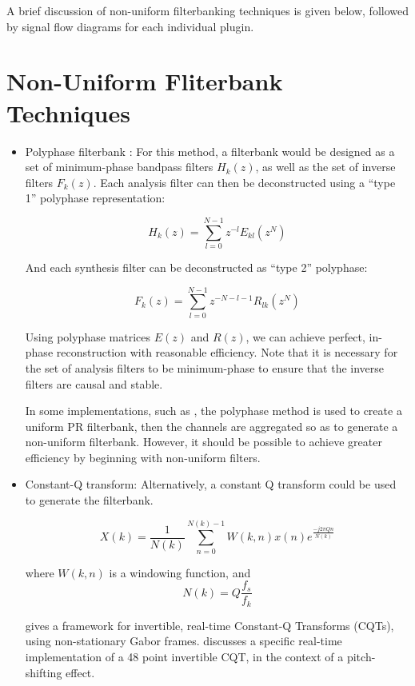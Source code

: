 \documentclass{article}
\begin{document}
A brief discussion of non-uniform filterbanking techniques is given below,
followed by signal flow diagrams for each individual plugin.

\section{Non-Uniform Fliterbank Techniques}
\begin{itemize}
    \item Polyphase filterbank \cite{SASPWEB2011}:
    For this method, a filterbank would be designed as a set of minimum-phase
    bandpass filters $H_k(z)$, as well as the set of inverse filters $F_k(z)$.
    Each analysis filter can then be deconstructed using a ``type 1'' polyphase
    representation:

    \begin{equation}
        H_k(z) = \sum_{l = 0}^{N-1} z^{-l} E_{kl}(z^N)
    \end{equation}

    And each synthesis filter can be deconstructed as ``type 2'' polyphase:

    \begin{equation}
        F_k(z) = \sum_{l = 0}^{N-1} z^{-N-l-1} R_{lk}(z^N)
    \end{equation}

    Using polyphase matrices $E(z)$ and $R(z)$, we can achieve perfect, in-phase
    reconstruction with reasonable efficiency. Note that it is necessary for
    the set of analysis filters to be minimum-phase to ensure
    that the inverse filters are causal and stable.
    
    In some implementations, such as \cite{GraphicEQ}, the polyphase method
    is used to create a uniform PR filterbank, then the channels are aggregated
    so as to generate a non-uniform filterbank. However, it should be possible
    to achieve greater efficiency by beginning with non-uniform filters.

    \item Constant-Q transform:
    Alternatively, a constant Q transform could be used to generate the filterbank.

    \begin{equation}
        X(k) = \frac{1}{N(k)} \sum_{n=0}^{N(k)-1} W(k,n) x(n) e^{\frac{-j2 \pi Qn}{N(k)}}
    \end{equation}

    where $W(k,n)$ is a windowing function, and
    \begin{equation}
        N(k) = Q \frac{f_s}{f_k}
    \end{equation}

    \cite{CQT_framework} gives a framework for invertible,
    real-time Constant-Q Transforms (CQTs), using non-stationary
    Gabor frames. \cite{Pitsh_Shift_CQT} discusses a specific real-time
    implementation of a 48 point invertible CQT, in the context of
    a pitch-shifting effect.
\end{itemize}
\end{document}

